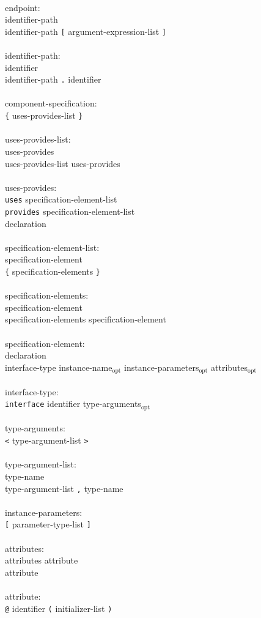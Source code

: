 \documentclass[11pt,letterpaper]{article}
\newcommand{\kw}[1]{{\tt #1}}
\newcommand{\opt}{$_{\mbox{opt}}$\xspace}
\begin{document}
\begin{tabbing}
\\
endpoint:\\
\>	identifier-path \\
\>	identifier-path \kw{[} argument-expression-list \kw{]}\\
\\
identifier-path:\\
\>	identifier\\
\>	identifier-path \kw{.} identifier\\
\\
component-specification:\\
\>	\kw{\{} uses-provides-list \kw{\}}\\
\\
uses-provides-list:\\
\>	uses-provides\\
\>	uses-provides-list uses-provides\\
\\
uses-provides:\\
\>	\kw{uses} specification-element-list\\
\>	\kw{provides} specification-element-list\\
\>	declaration\\
\\
specification-element-list:\\
\>	specification-element\\
\>	\kw{\{} specification-elements \kw{\}}\\
\\
specification-elements:\\
\>	specification-element\\
\>	specification-elements specification-element\\
\\
specification-element:\\
\>	declaration\\
\>	interface-type instance-name\opt instance-parameters\opt attributes\opt\\
\\
interface-type:\\
\>	\kw{interface} identifier type-arguments\opt\\
\\
type-arguments:\\
\>	\kw{<} type-argument-list \kw{>}\\
\\
type-argument-list:\\
\>	type-name\\
\>	type-argument-list \kw{,} type-name\\
\\
instance-parameters:\\
\>	\kw{[} parameter-type-list \kw{]}\\
\\
attributes:\\
\>	attributes attribute\\
\>	attribute\\
\\
attribute:\\
\>	\kw{@} identifier \kw{(} initializer-list \kw{)}\\
\end{tabbing} \rm
\end{document}
